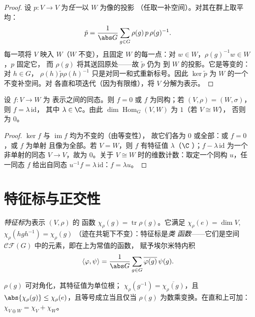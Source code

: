 \begin{proof}
设 $p \colon V \to V$ 为\emph{任一}以 $W$ 为像的投影
（任取一补空间）。对其在群上取平均：
\[
\tilde p = \frac1{\abs G}\sum_{g \in G} \rho(g)\,p\,\rho(g)^{-1}.
\]
每一项将 $V$ 映入 $W$（$W$ 不变），且固定 $W$
的每一点：对 $w \in W$，$\rho(g)^{-1}w \in W$，$p$ 固定它，
而 $\rho(g)$ 将其送回原处——故 $\tilde p$ 仍为
到 $W$ 的投影。它是等变的：对 $h \in G$，
$\rho(h)\tilde p\rho(h)^{-1}$ 只是对同一和式重新标号。因此 $\ker
\tilde p$ 为 $W$ 的一个不变补空间。对
各直和项迭代（因为有限维），将 $V$ 分解为表示。
\end{proof}

\begin{theorem}[舒尔引理]\label{thm:b3:representations:schur}
设 $f \colon V \to W$ 为\emph{}
表示之间的同态。则 $f = 0$ 或 $f$ 为同构；若
$(V,\rho) = (W,\sigma)$，则 $f = \lambda\,\mathrm{id}$，
其中 $\lambda \in \C$。由此
$\dim\operatorname{Hom}_G(V, W)$ 为 $1$（若 $V \cong W$），
否则为 $0$。
\end{theorem}

\begin{proof}
$\ker f$ 与 $\operatorname{im} f$ 均为不变的（由等变性），
故它们各为 $0$ 或全部：或 $f = 0$，或 $f$ 为单射
且像为全部。若 $V = W$，则 $f$ 有特征值 $\lambda$（$\C$
）；$f - \lambda\,\mathrm{id}$ 为一个
非单射的同态 $V \to V$，故为 $0$。关于
$V \cong W$ 时的维数计数：取定一个同构 $u$，任一同态
$f$ 给出自同态 $u^{-1}f = \lambda\,\mathrm{id}$：$f =
\lambda u$。
\end{proof}

\section{特征标与正交性}

\begin{definition}\label{def:b3:representations:character}
\emph{特征标}为表示 $(V, \rho)$ 的
函数 $\chi_\rho(g) = \operatorname{tr}\rho(g)$。它满足
$\chi_\rho(e) = \dim V$, $\chi_\rho(hgh^{-1}) = \chi_\rho(g)$
（迹在共轭下不变）：特征标是\emph{类
函数}——它们是空间
$\mathcal{CF}(G)$ 中的元素，即在上为常值的函数，
赋予埃尔米特内积
\[
\langle \varphi, \psi\rangle = \frac1{\abs G}\sum_{g \in G}
\overline{\varphi(g)}\,\psi(g).
\]
\end{definition}

\begin{proposition}\label{prop:b3:representations:charbasics}
$\rho(g)$ 可对角化，其特征值为单位根；
$\chi_\rho(g^{-1}) = \overline{\chi_\rho(g)}$，且
$\abs{\chi_\rho(g)} \leq \chi_\rho(e)$，且等号成立当且仅当
$\rho(g)$ 为数乘变换。在直和上可加：$\chi_{V
\oplus W} = \chi_V + \chi_W$。
\end{proposition}

